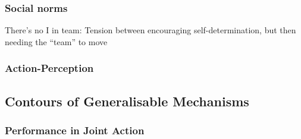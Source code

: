 
    \subsubsection{Social norms}

    There's no I in team:
    Tension between encouraging self-determination, but then needing the ``team'' to move







    \subsubsection{Action-Perception}








  \subsection{Contours of Generalisable Mechanisms}

    \subsubsection{Performance in Joint Action}


